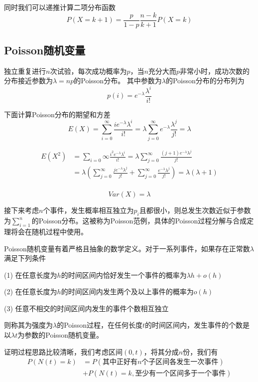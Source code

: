 \documentclass[UTF8]{ctexart}
\begin{document}
同时我们可以递推计算二项分布函数
$$P(X=k+1)=\frac{p}{1-p} \frac{n-k}{k+1}P(X=k)$$

\subsection{Poisson随机变量}

独立重复进行$n$次试验，每次成功概率为$p$，当$n$充分大而$p$非常小时，成功次数的分布接近参数为$\lambda =np$的Poisson分布。
其中参数为$\lambda $的Poisson分布的分布列为
$$p(i)=e^{-\lambda }\frac{\lambda^{i}}{i!}$$

下面计算Poisson分布的期望和方差
$$E(X)=\sum_{i=0}^{\infty }\frac{ie^{-\lambda }\lambda^{i}}{i!}=\lambda \sum_{j=0}^{\infty }e^{-\lambda}\frac{\lambda^{j}}{j!}=\lambda $$

$$\begin{aligned}
E(X^{2})&=\sum_{i=0}{\infty }\frac{i^{2}e^{-\lambda }\lambda^{i}}{i!}=\lambda \sum_{j=0}^{\infty }\frac{(j+1)e^{-\lambda }\lambda^{j}}{j!}\\
&=\lambda (\sum_{j=0}^{\infty }\frac{je^{-\lambda }\lambda^{j}}{j!}+\sum_{j=0}^{\infty } \frac {e^{-\lambda } \lambda^{j}}{j!})=\lambda (\lambda +1)\\
\end{aligned} $$

$$Var(X)=\lambda $$

接下来考虑$n$个事件，发生概率相互独立为$p_{i}$且都很小，则总发生次数近似于参数为$\sum\limits_{i=1}^{n} $的Poisson分布。这被称为Poisson范例，具体的Poisson过程分解与合成定理将会在随机过程中使用。

Poisson随机变量有着严格且抽象的数学定义。对于一系列事件，如果存在正常数$\lambda $满足下列条件

(1) 在任意长度为$h$的时间区间内恰好发生一个事件的概率为$\lambda h+o(h)$

(2) 在任意长度为$h$的时间区间内发生两个及以上事件的概率为$o(h)$

(3) 任意不相交的时间区间内发生的事件个数相互独立

则称其为强度为$\lambda $的Poisson过程，在任何长度$t$的时间区间内，发生事件的个数是以$\lambda t$为参数的Poisson随机变量。

证明过程思路比较清晰，我们考虑区间$(0,t)$，将其分成$n$份，我们有
$$\begin{aligned}
P(N(t)=k)&=P(\text{其中正好有}n\text{个子区间各发生一次事件})\\
&+P(N(t)=k,\text{至少有一个区间多于一个事件})\\
\end{aligned}$$
\end{document}
